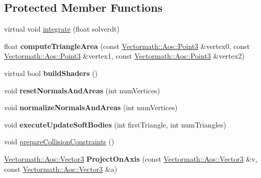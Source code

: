 \subsection*{Protected Member Functions}
\begin{DoxyCompactItemize}
\item 
virtual void \hyperlink{classbtDX11SoftBodySolver_a3daaaf85934fabb4c38ae0d32ec77678}{integrate} (float solverdt)
\item 
\mbox{\label{classbtDX11SoftBodySolver_ab9ced309389f25315b8e8a4a7bca2d32}} 
float {\bfseries compute\+Triangle\+Area} (const \hyperlink{classVectormath_1_1Aos_1_1Point3}{Vectormath\+::\+Aos\+::\+Point3} \&vertex0, const \hyperlink{classVectormath_1_1Aos_1_1Point3}{Vectormath\+::\+Aos\+::\+Point3} \&vertex1, const \hyperlink{classVectormath_1_1Aos_1_1Point3}{Vectormath\+::\+Aos\+::\+Point3} \&vertex2)
\item 
\mbox{\label{classbtDX11SoftBodySolver_a6882e59c906688e8dd7c5e8577ae06e3}} 
virtual bool {\bfseries build\+Shaders} ()
\item 
\mbox{\label{classbtDX11SoftBodySolver_a58570c531d86cef2819fce83e58b143b}} 
void {\bfseries reset\+Normals\+And\+Areas} (int num\+Vertices)
\item 
\mbox{\label{classbtDX11SoftBodySolver_a53a44cfa955c8732830fb7f6ea883374}} 
void {\bfseries normalize\+Normals\+And\+Areas} (int num\+Vertices)
\item 
\mbox{\label{classbtDX11SoftBodySolver_a1fb539e6d26045cd5d3aa74db49f072c}} 
void {\bfseries execute\+Update\+Soft\+Bodies} (int first\+Triangle, int num\+Triangles)
\item 
void \hyperlink{classbtDX11SoftBodySolver_a887cc48c63b010cd511e11ce11ea6acd}{prepare\+Collision\+Constraints} ()
\item 
\mbox{\label{classbtDX11SoftBodySolver_a5f9cf994e2905b2ca50c0f1da8f7bf2e}} 
\hyperlink{classVectormath_1_1Aos_1_1Vector3}{Vectormath\+::\+Aos\+::\+Vector3} {\bfseries Project\+On\+Axis} (const \hyperlink{classVectormath_1_1Aos_1_1Vector3}{Vectormath\+::\+Aos\+::\+Vector3} \&v, const \hyperlink{classVectormath_1_1Aos_1_1Vector3}{Vectormath\+::\+Aos\+::\+Vector3} \&a)

\end{DoxyCompactItemize}
